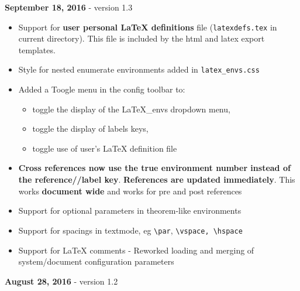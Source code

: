 \textbf{September 18, 2016} - version 1.3

\begin{itemize}
\tightlist
\item
  Support for \textbf{user personal LaTeX definitions} file
  (\texttt{latexdefs.tex} in current directory). This file is included
  by the html and latex export templates.\\
\item
  Style for nested enumerate environments added in
  \texttt{latex\_envs.css}
\item
  Added a Toogle menu in the config toolbar to:

  \begin{itemize}
  \tightlist
  \item
    toggle the display of the LaTeX\_envs dropdown menu,
  \item
    toggle the display of labels keys,
  \item
    toggle use of user's LaTeX definition file
  \end{itemize}
\item
  \textbf{Cross references now use the true environment number instead
  of the reference//label key}. \textbf{References are updated
  immediately}. This works \textbf{document wide} and works for pre and
  post references
\item
  Support for optional parameters in theorem-like environments
\item
  Support for spacings in textmode, eg \texttt{\textbackslash{}par},
  \texttt{\textbackslash{}vspace,\ \textbackslash{}hspace}
\item
  Support for LaTeX comments %
- Reworked
  loading and merging of system/document configuration parameters
\end{itemize}

\textbf{August 28, 2016} - version 1.2

